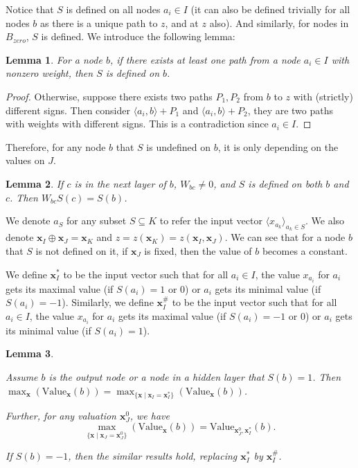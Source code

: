 \documentclass[]{article}
\newtheorem{lemma}{Lemma}
\theoremstyle{definition}
\newcommand{\Val}{\mathrm{Value}}
\begin{document}
Notice that $S$ is defined on all nodes $a_i \in I$ (it can also be defined trivially for all nodes $b$ as there is a unique path to $z$, and at $z$ also). And similarly, for nodes in  $B_{zero}$, $S$ is defined. We introduce the following lemma:

\begin{lemma}\label{lem:sign}
	For a node $b$, if there exists at least one path from a node $a_i\in I$ with nonzero weight, then  $S$ is defined on $b$.
\end{lemma}

\begin{proof}
	Otherwise, suppose there exists two paths $P_1,P_2$ from $b$ to $z$ with (strictly) different signs. Then consider $\langle a_i,b\rangle+P_1$ and $\langle a_i,b\rangle+P_2$, they are two paths with weights with different signs. This is a contradiction since $a_i\in I$.
\end{proof}
Therefore, for any node $b$  that $S$ is undefined on $b$, it is only depending on the values on $J$.  

\begin{lemma}
	If $c$ is in the next layer of $b$, $W_{bc}\neq 0$, and $S$ is defined on both $b$ and $c$. Then $W_{bc}S(c)=S(b)$.
\end{lemma}


We denote $a_S$ for any subset $S\subseteq K$ to refer the input vector $\langle x_{a_k}\rangle_{a_k\in S}$. We also denote $\boldsymbol{x}_I\oplus \boldsymbol{x}_J = \boldsymbol{x}_K$ and $z=z(\boldsymbol{x}_K)=z(\boldsymbol{x}_I,\boldsymbol{x}_J)$. We can see that for a node $b$ that $S$ is not defined on it, if $\boldsymbol{x}_J$ is fixed, then the value of $b$ becomes a constant.

We define $\boldsymbol{x}_I^*$ to be the input vector such that for all $a_i \in I$, the value $x_{a_i}$ for $a_i$ gets its maximal value (if $S(a_i)=1$ or $0$) or $a_i$ gets its minimal value (if $S(a_i)=-1$). Similarly, we define $\boldsymbol{x}_I^\#$ to be the input vector such that for all $a_i \in I$, the value $x_{a_i}$ for $a_i$ gets its maximal value (if $S(a_i)=-1$ or $0$) or $a_i$ gets its minimal value (if $S(a_i)=1$).



\begin{lemma} \label{lem:reach_max_2}
	
	Assume $b$ is the output node or a node in a hidden layer that $S(b)=1$. Then
	$\max_{\boldsymbol{x}} (\Val_{\boldsymbol{x}}(b)) =\max_{\{\boldsymbol{x} \mid \boldsymbol{x}_I=\boldsymbol{x}^*_I\}} (\Val_{\boldsymbol{x}}(b))$.
	
	Further,  for any valuation $\boldsymbol{x}^0_J$, 
	we have $$\max_{\{\boldsymbol{x} \mid \boldsymbol{x}_J=\boldsymbol{x}^0_J\}} (\Val_{\boldsymbol{x}}(b)) =  \Val_{\boldsymbol{x}^0_J,\boldsymbol{x}_I^*}(b).$$
	
	If $S(b)=-1$, then the similar results hold, replacing $\boldsymbol{x}^*_I$ by $\boldsymbol{x}^\#_I$. 
\end{lemma}
\end{document}
